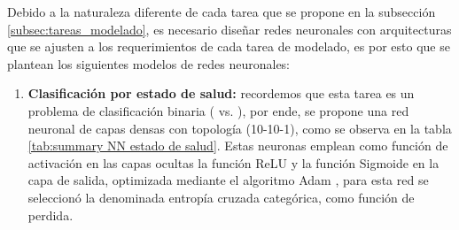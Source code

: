 \documentclass[12pt,letterpaper,oneside,openright]{book}
\begin{document}
Debido a la naturaleza diferente de cada tarea que se propone en la subsección \ref{subsec:tareas_modelado}, es necesario diseñar redes neuronales con arquitecturas que se ajusten a los requerimientos de cada tarea de modelado, es por esto que se plantean los siguientes modelos de redes neuronales:
\begin{enumerate}
	\item \textbf{Clasificación por estado de salud:} recordemos que esta tarea es un problema de clasificación binaria ( vs. ), por ende, se propone una red neuronal de capas densas con topología (10-10-1), como se observa en la tabla \ref{tab:summary NN estado de salud}. Estas neuronas emplean como función de activación en las capas ocultas la función ReLU y la función Sigmoide en la capa de salida, optimizada mediante el algoritmo Adam \cite{adamoptimization14}, para esta red se seleccionó la denominada entropía cruzada categórica, como función de perdida. 
	

\end{enumerate}
\end{document}
